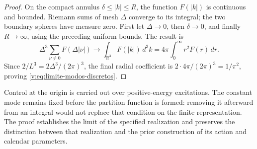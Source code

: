 \begin{proof}
On the compact annulus \(\delta\leq|k|\leq R\), the function
\(F(|k|)\) is continuous and bounded. Riemann sums of mesh
\(\Delta\) converge to its integral; the two boundary spheres
have measure zero. First let \(\Delta\to0\), then
\(\delta\to0\), and finally \(R\to\infty\), using the preceding
uniform bounds. The result is
\[
 \Delta^3\sum_{\nu\ne0}F(\Delta|\nu|)
 \longrightarrow \int_{\mathbb R^3}F(|k|)\,d^3k
 =4\pi\int_0^\infty r^2F(r)\,dr.
\]
Since \(2/L^3=2\Delta^3/(2\pi)^3\), the final radial coefficient
is \(2\cdot4\pi/(2\pi)^3=1/\pi^2\), proving
\eqref{v:eq:limite-modos-discretos}.
\end{proof}

Control at the origin is carried out over positive-energy excitations.
The constant mode remains fixed before the partition function is formed:
removing it afterward from an integral would not replace that condition on
the finite representation. The proof establishes the limit of the
specified realization and preserves the distinction between that realization and
the prior construction of its action and calendar parameters.
